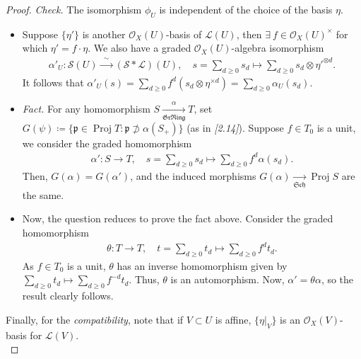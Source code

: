 \documentclass[11pt,a4paper,footinclude=true,headinclude=true]{scrbook} %
\DeclareMathOperator{\Proj}{Proj}
\newcommand{\LL}{\mathscr{L}}
\newcommand{\OO}{\mathcal{O}}
\newcommand{\Ss}{\mathscr{S}}
\newcommand{\pp}{\mathfrak{p}}
\newcommand{\Sch}{\mathfrak{Sch}}
\newcommand{\Ring}{\mathfrak{Ring}}
\newcommand{\<}{\langle}
\newcommand{\>}{\rangle}
\newcommand{\GR}{\mathfrak{Gr}}
\begin{document}
\begin{proof}
    \textit{Check.} The isomorphism $\phi_U$ is independent of the choice of the basis $\eta$.
    \begin{itemize}
        \item Suppose $\{\eta'\}$ is another $\OO_X(U)$-basis of $\LL(U)$, then $\exists\ f\in\OO_X(U)^\times$ for which $\eta'=f\cdot\eta$. We also have a graded $\OO_X(U)$-algebra isomorphism 
        \begin{align*}
            \alpha'_U:\Ss(U)\xrightarrow{~~\sim~~}(\Ss\ast\LL)(U),\quad s=\sum_{d\geq0}s_d\longmapsto\sum_{d\geq0}s_d\otimes\eta'^{\otimes d}.
        \end{align*}
        It follows that $\alpha'_U(s)=\sum_{d\geq0}f^d(s_d\otimes\eta^{\times d})=\sum_{d\geq0}\alpha_U(s_d)$.
        \item \textit{Fact.} For any homomorphism $S\xrightarrow[\GR\Ring]{\alpha}T$, set $G(\psi)\coloneqq\{\pp\in\Proj T:\pp\not\supset\alpha(S_+)\}$ (as in \textit{[2.14]}). Suppose $f\in T_0$ is a unit, we consider the graded homomorphism
        \begin{align*}
            \alpha':S\longrightarrow T,\quad s=\sum_{d\geq0}s_d\longmapsto\sum_{d\geq0}f^d\alpha(s_d).
        \end{align*}
        Then, $G(\alpha)=G(\alpha')$, and the induced morphisms $G(\alpha)\xrightarrow[\Sch]{}\Proj S$ are the same.
        \item Now, the question reduces to prove the fact above. Consider the graded homomorphism
        \begin{align*}
            \theta:T\longrightarrow T,\quad t=\sum_{d\geq0}t_d\longmapsto\sum_{d\geq0}f^dt_d.
        \end{align*}
        As $f\in T_0$ is a unit, $\theta$ has an inverse homomorphism given by $\sum_{d\geq0}t_d\mapsto\sum_{d\geq0}f^{-d}t_d$. Thus, $\theta$ is an automorphism. Now, $\alpha'=\theta\alpha$, so the result clearly follows.
    \end{itemize}
    Finally, for the \textit{compatibility}, note that if $V\subset U$ is affine, $\{\eta|_V\}$ is an $\OO_X(V)$-basis for $\LL(V)$.\\
    

\end{proof}
\end{document}
